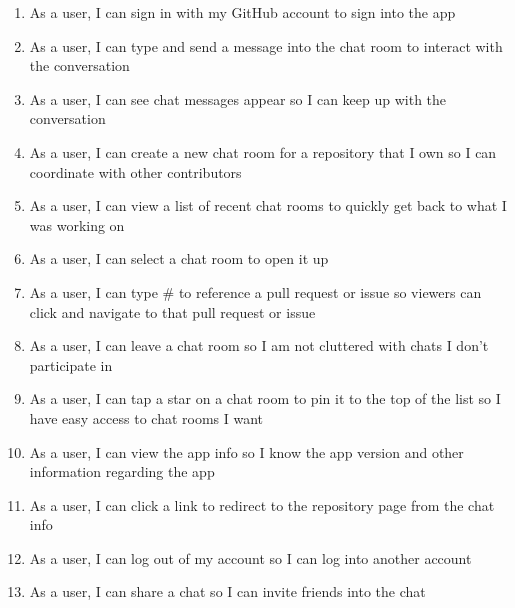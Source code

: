 \documentclass{report}
\begin{document}
\begin{enumerate}
    \item As a user, I can sign in with my GitHub account to sign into the app
    \item As a user, I can type and send a message into the chat room to interact with the conversation
    \item As a user, I can see chat messages appear so I can keep up with the conversation
    \item As a user, I can create a new chat room for a repository that I own so I can coordinate with other contributors
    \item As a user, I can view a list of recent chat rooms to quickly get back to what I was working on
    \item As a user, I can select a chat room to open it up
    \item As a user, I can type \# to reference a pull request or issue so viewers can click and navigate to that pull request or issue
    \item As a user, I can leave a chat room so I am not cluttered with chats I don't participate in
    \item As a user, I can tap a star on a chat room to pin it to the top of the list so I have easy access to chat rooms I want
    \item As a user, I can view the app info so I know the app version and other information regarding the app
    \item As a user, I can click a link to redirect to the repository page from the chat info
    \item As a user, I can log out of my account so I can log into another account
    \item As a user, I can share a chat so I can invite friends into the chat
\end{enumerate}

\end{document}
